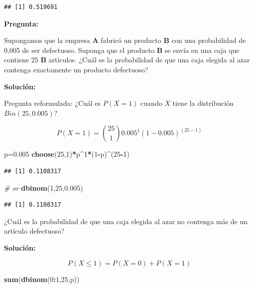 \documentclass[]{book}
\newenvironment{Shaded}{\begin{snugshade}}{\end{snugshade}}
\newcommand{\KeywordTok}[1]{\textcolor[rgb]{0.13,0.29,0.53}{\textbf{#1}}}
\newcommand{\DecValTok}[1]{\textcolor[rgb]{0.00,0.00,0.81}{#1}}
\newcommand{\FloatTok}[1]{\textcolor[rgb]{0.00,0.00,0.81}{#1}}
\newcommand{\CommentTok}[1]{\textcolor[rgb]{0.56,0.35,0.01}{\textit{#1}}}
\newcommand{\OperatorTok}[1]{\textcolor[rgb]{0.81,0.36,0.00}{\textbf{#1}}}
\newcommand{\NormalTok}[1]{#1}
\begin{document}
\begin{verbatim}
## [1] 0.519691
\end{verbatim}

\textbf{Pregunta:}

Supongamos que la empresa \textbf{A} fabricó un producto \textbf{B} con
una probabilidad de 0,005 de ser defectuoso. Suponga que el producto
\textbf{B} se envía en una caja que contiene 25 \textbf{B} artículos.
¿Cuál es la probabilidad de que una caja elegida al azar contenga
exactamente un producto defectuoso?

\textbf{Solución:}

Pregunta reformulada: ¿Cuál es \(P(X = 1)\) cuando \(X\) tiene la
distribución \(Bin(25, 0.005)\)?

\[
  P(X=1) = \binom{25}{1} 0.005^{1} (1-0.005)^{(25-1)}
\]

\begin{Shaded}
\begin{Highlighting}[]
\NormalTok{p=}\FloatTok{0.005}
\KeywordTok{choose}\NormalTok{(}\DecValTok{25}\NormalTok{,}\DecValTok{1}\NormalTok{)}\OperatorTok{*}\NormalTok{p}\OperatorTok{^}\DecValTok{1}\OperatorTok{*}\NormalTok{(}\DecValTok{1}\OperatorTok{-}\NormalTok{p)}\OperatorTok{^}\NormalTok{(}\DecValTok{25}\OperatorTok{-}\DecValTok{1}\NormalTok{)}
\end{Highlighting}
\end{Shaded}

\begin{verbatim}
## [1] 0.1108317
\end{verbatim}

\begin{Shaded}
\begin{Highlighting}[]
\CommentTok{# or}
\KeywordTok{dbinom}\NormalTok{(}\DecValTok{1}\NormalTok{,}\DecValTok{25}\NormalTok{,}\FloatTok{0.005}\NormalTok{)}
\end{Highlighting}
\end{Shaded}

\begin{verbatim}
## [1] 0.1108317
\end{verbatim}

¿Cuál es la probabilidad de que una caja elegida al azar no contenga más
de un artículo defectuoso?

\textbf{Solución:}

\[
P(X\leq 1) = P(X=0) + P(X=1)
\]

\begin{Shaded}
\begin{Highlighting}[]
\KeywordTok{sum}\NormalTok{(}\KeywordTok{dbinom}\NormalTok{(}\DecValTok{0}\OperatorTok{:}\DecValTok{1}\NormalTok{,}\DecValTok{25}\NormalTok{,p))}
\end{Highlighting}
\end{Shaded}
\end{document}

